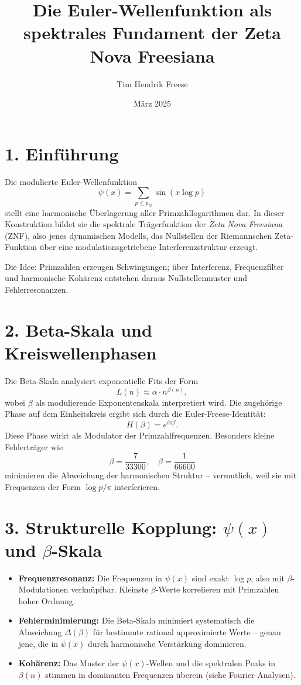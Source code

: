 \documentclass[12pt]{article}
\title{\textbf{Die Euler-Wellenfunktion als spektrales Fundament der Zeta Nova Freesiana}}
\author{Tim Hendrik Freese}
\date{März 2025}
\begin{document}
\maketitle

\section*{1. Einführung}

Die modulierte Euler-Wellenfunktion
\[
\psi(x) = \sum_{p \leq p_N} \sin(x \log p)
\]
stellt eine harmonische Überlagerung aller Primzahllogarithmen dar. In dieser Konstruktion bildet sie die spektrale Trägerfunktion der \textit{Zeta Nova Freesiana} (ZNF), also jenes dynamischen Modells, das Nullstellen der Riemannschen Zeta-Funktion über eine modulationsgetriebene Interferenzstruktur erzeugt.

\vspace{1em}
Die Idee: Primzahlen erzeugen Schwingungen; über Interferenz, Frequenzfilter und harmonische Kohärenz entstehen daraus Nullstellenmuster und Fehlerresonanzen.

\section*{2. Beta-Skala und Kreiswellenphasen}

Die Beta-Skala analysiert exponentielle Fits der Form
\[
L(n) \approx \alpha \cdot n^{\beta(n)},
\]
wobei \(\beta\) als modulierende Exponentenskala interpretiert wird. Die zugehörige Phase auf dem Einheitskreis ergibt sich durch die Euler-Freese-Identität:
\[
H(\beta) = e^{i\pi \beta}.
\]
Diese Phase wirkt als Modulator der Primzahlfrequenzen. Besonders kleine Fehlerträger wie
\[
\beta = \frac{7}{33300}, \quad \beta = \frac{1}{66600}
\]
minimieren die Abweichung der harmonischen Struktur – vermutlich, weil sie mit Frequenzen der Form \(\log p / \pi\) interferieren.

\section*{3. Strukturelle Kopplung: \(\psi(x)\) und \(\beta\)-Skala}

\begin{itemize}[leftmargin=1.5em]
  \item \textbf{Frequenzresonanz:} Die Frequenzen in \(\psi(x)\) sind exakt \(\log p\), also mit \(\beta\)-Modulationen verknüpfbar. Kleinste \(\beta\)-Werte korrelieren mit Primzahlen hoher Ordnung.
  \item \textbf{Fehlerminimierung:} Die Beta-Skala minimiert systematisch die Abweichung \(\Delta(\beta)\) für bestimmte rational approximierte Werte – genau jene, die in \(\psi(x)\) durch harmonische Verstärkung dominieren.
  \item \textbf{Kohärenz:} Das Muster der \(\psi(x)\)-Wellen und die spektralen Peaks in \(\beta(n)\) stimmen in dominanten Frequenzen überein (siehe Fourier-Analysen).
\end{itemize}
\end{document}
